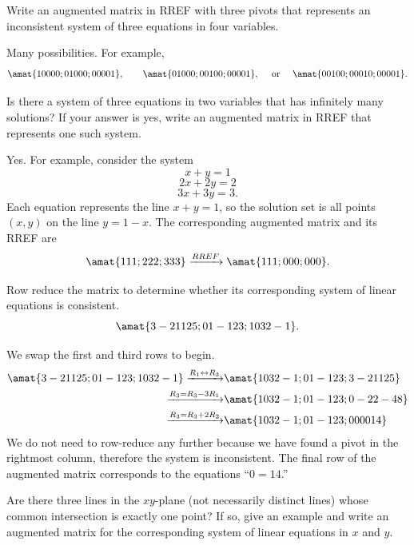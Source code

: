 \begin{problems}
\problem Write an augmented matrix in RREF with three pivots that
  represents an inconsistent system of three equations in four
  variables.

	\begin{solution}
      Many possibilities.  For example,
      \[\amat{1 0 0 0 0; 0 1 0 0 0; 0 0 0 0 1},
        \qquad \amat{0 1 0 0 0; 0 0 1 0 0; 0 0 0 0 1}, \quad \textup{
          or } \quad \amat{0 0 1 0 0; 0 0 0 1 0; 0 0 0 0 1}.\]
	\end{solution}
	
  \problem Is there a system of three equations in two variables
    that has infinitely many solutions?  If your answer is yes, write
    an augmented matrix in RREF that represents one such system.

	\begin{solution}
      Yes.  For example, consider the system
	\[ x + y = 1\]
	\[ 2x + 2y = 2\]
	\[ 3x + 3y = 3.\] Each equation represents the line $x + y = 1$,
    so the solution set is all points $(x,y)$ on the line $y =
    1-x$. The corresponding augmented matrix and its RREF are
	\[\amat{1 1 1; 2 2 2; 3 3 3} \xrightarrow[]{RREF} \amat{1 1 1; 0 0
        0; 0 0 0}.\]
  \end{solution}

  \problem Row reduce the matrix to determine whether its
  corresponding system of linear equations is consistent.
  \[\amat{3 -2 11 2 5; 0 1 -1 2 3; 1 0 3 2 -1}.\]
  \begin{solution}
    We swap the first and third rows to begin.
    \begin{align*}
      \amat{3 -2 11 2 5; 0 1 -1 2 3; 1 0 3 2 -1}
      \xrightarrow[]{R_1 \leftrightarrow R_3}
      &
        \amat{1 0 3 2 -1; 0 1 -1 2 3; 3 -2 11 2 5}
      \\
      \xrightarrow[]{R_3 = R_3 - 3 R_1}
      &
        \amat{1 0 3 2 -1; 0 1 -1 2 3; 0 -2 2 -4 8}
      \\
      \xrightarrow[]{R_3 = R_3 + 2R_2}
      &
        \amat{1 0 3 2 -1; 0 1 -1 2 3; 0 0 0 0 14}
    \end{align*}
    We do not need to row-reduce any further because we have found
    a pivot in the rightmost column, therefore the system is inconsistent.
    The final row of the augmented matrix corresponds to the equations
    ``$0 = 14$.''
  \end{solution}
  
  \problem Are there three lines in the $xy$-plane (not necessarily
  distinct lines) whose common intersection is exactly one point?  If
  so, give an example and write an augmented matrix for the
  corresponding system of linear equations in $x$ and $y$.
	

\end{problems}

